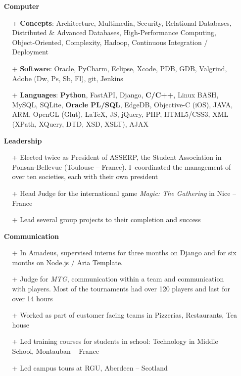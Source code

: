 \documentclass{res}
\begin{document}
\begin{resume}
        \begin{itemize}
        \item[] \faLaptopCode~\textbf{Computer}
                \begin{itemize}
                  \item[+] \textbf{Concepts}: Architecture, Multimedia, Security, Relational Databases, Distributed \& Advanced Databases, High-Performance Computing, Object-Oriented, Complexity, Hadoop, Continuous Integration / Deployment
                  \item[+] \textbf{Software}: Oracle, PyCharm, Eclipse, Xcode, PDB, GDB, Valgrind, Adobe (Dw, Ps, Sb, Fl), git, Jenkins
                  \item[+] \textbf{Languages}: \textbf{Python}, FastAPI, Django, \textbf{C/C++}, Linux BASH, MySQL, SQLite, \textbf{Oracle PL/SQL}, EdgeDB, Objective-C (iOS), JAVA, ARM, OpenGL (Glut), \LaTeX{}, JS, jQuery, PHP, HTML5/CSS3, XML (XPath, XQuery, DTD, XSD, XSLT), AJAX
                \end{itemize}
        \end{itemize}

        \begin{itemize}
        \item[] \faHandshake[regular]~\textbf{Leadership}
                \begin{itemize}
                   \item[+] Elected twice as President of ASSERP, the Student Association in Ponsan-Bellevue (Toulouse -- France). I~coordinated the management of over ten societies, each with their own president
                  \item[+] Head Judge for the international game \textit{Magic: The Gathering} in Nice -- France
                  \item[+] Lead several group projects to their completion and success
                \end{itemize}   
        \end{itemize}
        
        \begin{itemize}
        \item[] \faComments[regular]~\textbf{Communication}
            \begin{itemize}
							\item[+] In Amadeus, supervised interns for three months on Django and for six months on Node.js / Aria Template.
                \item[+] Judge for \textit{MTG}, communication within a team and communication with players. Most of the tournaments had over 120 players and last for over 14 hours
                \item[+] Worked as part of customer facing teams in Pizzerias, Restaurants, Tea house
                \item[+] Led training courses for students in school: Technology in Middle School, Montauban -- France
                \item[+]  Led campus tours at RGU, Aberdeen -- Scotland
            \end{itemize} 
        \end{itemize}


\end{resume}
\end{document}
